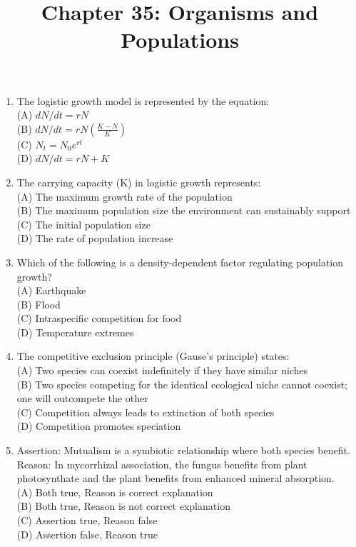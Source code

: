 \documentclass{article}
\begin{document}
\title{Chapter 35: Organisms and Populations}
\date{}
\maketitle

\begin{enumerate}[label=Q\arabic*.]

\item The logistic growth model is represented by the equation:
\\(A) $dN/dt = rN$
\\(B) $dN/dt = rN\left(\frac{K-N}{K}\right)$
\\(C) $N_t = N_0 e^{rt}$
\\(D) $dN/dt = rN + K$

\item The carrying capacity (K) in logistic growth represents:
\\(A) The maximum growth rate of the population
\\(B) The maximum population size the environment can sustainably support
\\(C) The initial population size
\\(D) The rate of population increase

\item Which of the following is a density-dependent factor regulating population growth?
\\(A) Earthquake
\\(B) Flood
\\(C) Intraspecific competition for food
\\(D) Temperature extremes

\item The competitive exclusion principle (Gause's principle) states:
\\(A) Two species can coexist indefinitely if they have similar niches
\\(B) Two species competing for the identical ecological niche cannot coexist; one will outcompete the other
\\(C) Competition always leads to extinction of both species
\\(D) Competition promotes speciation

\item Assertion: Mutualism is a symbiotic relationship where both species benefit.\\
Reason: In mycorrhizal association, the fungus benefits from plant photosynthate and the plant benefits from enhanced mineral absorption.
\\(A) Both true, Reason is correct explanation
\\(B) Both true, Reason is not correct explanation
\\(C) Assertion true, Reason false
\\(D) Assertion false, Reason true


\end{enumerate}
\end{document}
